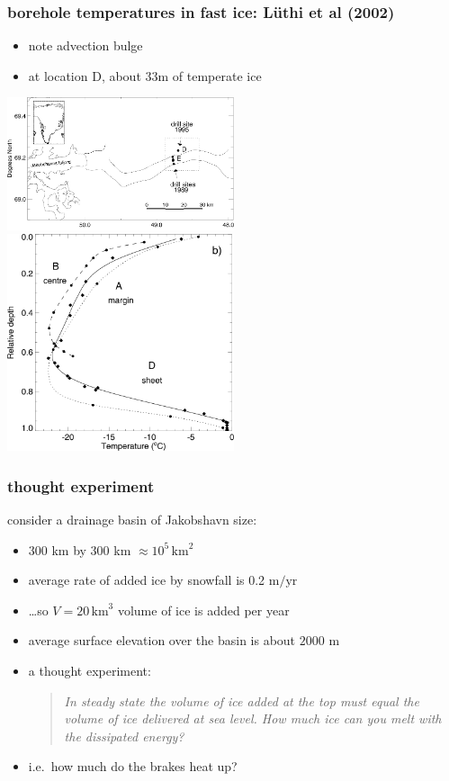 \documentclass{beamer}
\begin{document}
\begin{frame}
  \frametitle{borehole temperatures in fast ice: L\"uthi et al (2002)}

\begin{itemize}
\scriptsize
\item note advection bulge
\item at location D, about 33m of temperate ice
\end{itemize}

\vspace{-0.5in}
\begin{center}
  \mbox{\includegraphics[width=0.5\textwidth]{location_luthi2002.png}
\qquad \includegraphics[width=0.5\textwidth]{borehole_temps_luthi2002.png}}
\end{center}
\end{frame}


\begin{frame}
  \frametitle{thought experiment}

consider a drainage basin of Jakobshavn size:
\begin{itemize}
\item 300 km by 300 km $\approx 10^{5}\,\text{km}^2$
\item average rate of added ice by snowfall is 0.2 $\text{m}/\text{yr}$
\item \dots so $V = 20 \,\text{km}^3$ volume of ice is added per year
\item average surface elevation over the basin is about $2000$ m
\item a thought experiment:
\begin{quote}
\emph{In steady state the volume of ice added at the top must equal the volume of ice delivered at sea level.  How much ice can you melt with the dissipated energy?}
\end{quote}
\item i.e.~how much do the brakes heat up?
\end{itemize}
\end{frame}
\end{document}
